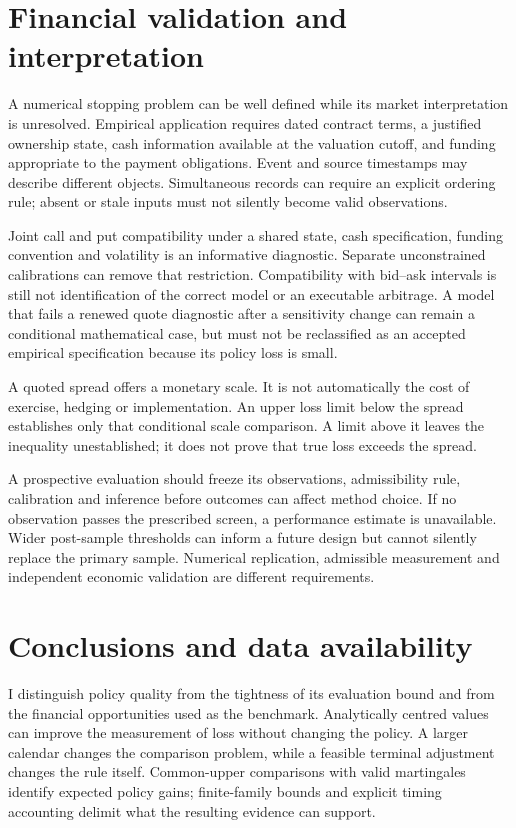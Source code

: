 \section{Financial validation and interpretation}

A numerical stopping problem can be well defined while its market interpretation is unresolved. Empirical application requires dated contract terms, a justified ownership state, cash information available at the valuation cutoff, and funding appropriate to the payment obligations. Event and source timestamps may describe different objects. Simultaneous records can require an explicit ordering rule; absent or stale inputs must not silently become valid observations.

Joint call and put compatibility under a shared state, cash specification, funding convention and volatility is an informative diagnostic. Separate unconstrained calibrations can remove that restriction. Compatibility with bid--ask intervals is still not identification of the correct model or an executable arbitrage. A model that fails a renewed quote diagnostic after a sensitivity change can remain a conditional mathematical case, but must not be reclassified as an accepted empirical specification because its policy loss is small.

A quoted spread offers a monetary scale. It is not automatically the cost of exercise, hedging or implementation. An upper loss limit below the spread establishes only that conditional scale comparison. A limit above it leaves the inequality unestablished; it does not prove that true loss exceeds the spread.

A prospective evaluation should freeze its observations, admissibility rule, calibration and inference before outcomes can affect method choice. If no observation passes the prescribed screen, a performance estimate is unavailable. Wider post-sample thresholds can inform a future design but cannot silently replace the primary sample. Numerical replication, admissible measurement and independent economic validation are different requirements.

\section{Conclusions and data availability}

I distinguish policy quality from the tightness of its evaluation bound and from the financial opportunities used as the benchmark. Analytically centred values can improve the measurement of loss without changing the policy. A larger calendar changes the comparison problem, while a feasible terminal adjustment changes the rule itself. Common-upper comparisons with valid martingales identify expected policy gains; finite-family bounds and explicit timing accounting delimit what the resulting evidence can support.

